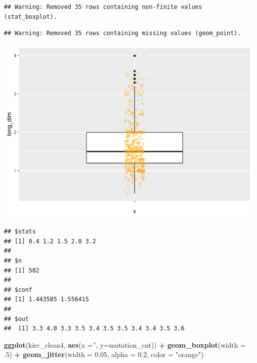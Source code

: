 \documentclass[]{article}
\newenvironment{Shaded}{\begin{snugshade}}{\end{snugshade}}
\newcommand{\KeywordTok}[1]{\textcolor[rgb]{0.13,0.29,0.53}{\textbf{#1}}}
\newcommand{\DataTypeTok}[1]{\textcolor[rgb]{0.13,0.29,0.53}{#1}}
\newcommand{\DecValTok}[1]{\textcolor[rgb]{0.00,0.00,0.81}{#1}}
\newcommand{\FloatTok}[1]{\textcolor[rgb]{0.00,0.00,0.81}{#1}}
\newcommand{\StringTok}[1]{\textcolor[rgb]{0.31,0.60,0.02}{#1}}
\newcommand{\OperatorTok}[1]{\textcolor[rgb]{0.81,0.36,0.00}{\textbf{#1}}}
\newcommand{\NormalTok}[1]{#1}
\begin{document}
\begin{verbatim}
## Warning: Removed 35 rows containing non-finite values (stat_boxplot).
\end{verbatim}

\begin{verbatim}
## Warning: Removed 35 rows containing missing values (geom_point).
\end{verbatim}

\includegraphics{figs/render-unnamed-chunk-22-1.pdf}

\begin{Shaded}
\end{Shaded}

\begin{verbatim}
## $stats
## [1] 0.4 1.2 1.5 2.0 3.2
## 
## $n
## [1] 502
## 
## $conf
## [1] 1.443585 1.556415
## 
## $out
##  [1] 3.3 4.0 3.3 3.5 3.4 3.5 3.5 3.4 3.4 3.5 3.6
\end{verbatim}

\begin{Shaded}
\begin{Highlighting}[]
\KeywordTok{ggplot}\NormalTok{(kirc_clean4, }\KeywordTok{aes}\NormalTok{(}\DataTypeTok{x =}\StringTok{''}\NormalTok{, }\DataTypeTok{y=}\NormalTok{mutation_cnt)) }\OperatorTok{+}
\StringTok{     }\KeywordTok{geom_boxplot}\NormalTok{(}\DataTypeTok{width =}\NormalTok{ .}\DecValTok{5}\NormalTok{) }\OperatorTok{+}
\StringTok{     }\KeywordTok{geom_jitter}\NormalTok{(}\DataTypeTok{width =} \FloatTok{0.05}\NormalTok{, }\DataTypeTok{alpha =} \FloatTok{0.2}\NormalTok{, }\DataTypeTok{color =} \StringTok{"orange"}\NormalTok{)}
\end{Highlighting}
\end{Shaded}
\end{document}
